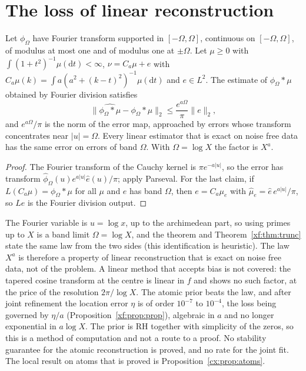 \section{The loss of linear reconstruction}

\begin{theorem}\label{xf:thm:loss}
Let $\phi_\Omega$ have Fourier transform supported in $[-\Omega,\Omega]$, continuous on $[-\Omega,\Omega]$, of modulus at most one and of modulus one at $\pm\Omega$. Let $\mu\ge0$ with $\int(1+t^2)^{-1}\mu(\mathrm dt)<\infty$, $\nu=C_a\mu+e$ with $C_a\mu(k)=\int a(a^2+(k-t)^2)^{-1}\mu(\mathrm dt)$ and $e\in L^2$. The estimate of $\phi_\Omega*\mu$ obtained by Fourier division satisfies
\[
\bigl\|\widehat{\phi_\Omega*\mu}-\phi_\Omega*\mu\bigr\|_2\le\frac{e^{a\Omega}}{\pi}\|e\|_2 ,
\]
and $e^{a\Omega}/\pi$ is the norm of the error map, approached by errors whose transform concentrates near $|u|=\Omega$. Every linear estimator that is exact on noise free data has the same error on errors of band $\Omega$. With $\Omega=\log X$ the factor is $X^a$.
\end{theorem}

\begin{proof}
The Fourier transform of the Cauchy kernel is $\pi e^{-a|u|}$, so the error has transform $\hat\phi_\Omega(u)e^{a|u|}\hat e(u)/\pi$; apply Parseval. For the last claim, if $L(C_a\mu)=\phi_\Omega*\mu$ for all $\mu$ and $e$ has band $\Omega$, then $e=C_a\mu_e$ with $\hat\mu_e=\hat e\,e^{a|u|}/\pi$, so $Le$ is the Fourier division output.
\end{proof}

The Fourier variable is $u=\log x$, up to the archimedean part, so using primes up to $X$ is a band limit $\Omega=\log X$, and the theorem and Theorem~\ref{xf:thm:trunc} state the same law from the two sides (this identification is heuristic). The law $X^{a}$ is therefore a property of linear reconstruction that is exact on noise free data, not of the problem. A linear method that accepts bias is not covered: the tapered cosine transform at the centre is linear in $f$ and shows no such factor, at the price of the resolution $2\pi/\log X$. The atomic prior beats the law, and after joint refinement the location error $\eta$ is of order $10^{-7}$ to $10^{-4}$, the loss being governed by $\eta/a$ (Proposition~\ref{xf:prop:prop}), algebraic in $a$ and no longer exponential in $a\log X$. The prior is RH together with simplicity of the zeros, so this is a method of computation and not a route to a proof. No stability guarantee for the atomic reconstruction is proved, and no rate for the joint fit. The local result on atoms that is proved is Proposition~\ref{cx:prop:atoms}.

